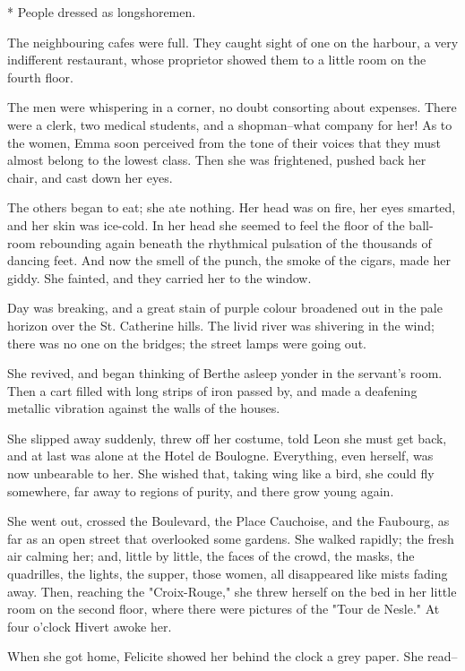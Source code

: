 \documentclass[11pt,twocolumn]{ltugboat}
\begin{document}
     * People dressed as longshoremen.


The neighbouring cafes were full. They caught sight of one on the
harbour, a very indifferent restaurant, whose proprietor showed them to
a little room on the fourth floor.

The men were whispering in a corner, no doubt consorting about expenses.
There were a clerk, two medical students, and a shopman--what company
for her! As to the women, Emma soon perceived from the tone of their
voices that they must almost belong to the lowest class. Then she was
frightened, pushed back her chair, and cast down her eyes.

The others began to eat; she ate nothing. Her head was on fire, her eyes
smarted, and her skin was ice-cold. In her head she seemed to feel the
floor of the ball-room rebounding again beneath the rhythmical pulsation
of the thousands of dancing feet. And now the smell of the punch, the
smoke of the cigars, made her giddy. She fainted, and they carried her
to the window.

Day was breaking, and a great stain of purple colour broadened out
in the pale horizon over the St. Catherine hills. The livid river was
shivering in the wind; there was no one on the bridges; the street lamps
were going out.

She revived, and began thinking of Berthe asleep yonder in the servant's
room. Then a cart filled with long strips of iron passed by, and made a
deafening metallic vibration against the walls of the houses.

She slipped away suddenly, threw off her costume, told Leon she must get
back, and at last was alone at the Hotel de Boulogne. Everything, even
herself, was now unbearable to her. She wished that, taking wing like a
bird, she could fly somewhere, far away to regions of purity, and there
grow young again.

She went out, crossed the Boulevard, the Place Cauchoise, and the
Faubourg, as far as an open street that overlooked some gardens. She
walked rapidly; the fresh air calming her; and, little by little, the
faces of the crowd, the masks, the quadrilles, the lights, the supper,
those women, all disappeared like mists fading away. Then, reaching the
"Croix-Rouge," she threw herself on the bed in her little room on the
second floor, where there were pictures of the "Tour de Nesle." At four
o'clock Hivert awoke her.

When she got home, Felicite showed her behind the clock a grey paper.
She read--
\end{document}

